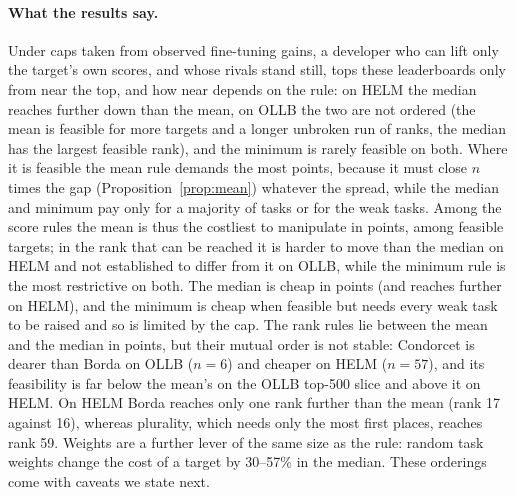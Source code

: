 \documentclass{article}
\begin{document}
\paragraph{What the results say.}
Under caps taken from observed fine-tuning gains, a developer who can lift only the target's own scores, and whose rivals stand still, tops these leaderboards only from near the top, and how near depends on the rule: on HELM the median reaches further down than the mean, on OLLB the two are not ordered (the mean is feasible for more targets and a longer unbroken run of ranks, the median has the largest feasible rank), and the minimum is rarely feasible on both. Where it is feasible the mean rule demands the most points, because it must close $n$ times the gap (Proposition~\ref{prop:mean}) whatever the spread, while the median and minimum pay only for a majority of tasks or for the weak tasks. Among the score rules the mean is thus the costliest to manipulate in points, among feasible targets; in the rank that can be reached it is harder to move than the median on HELM and not established to differ from it on OLLB, while the minimum rule is the most restrictive on both. The median is cheap in points (and reaches further on HELM), and the minimum is cheap when feasible but needs every weak task to be raised and so is limited by the cap. The rank rules lie between the mean and the median in points, but their mutual order is not stable: Condorcet is dearer than Borda on OLLB ($n=6$) and cheaper on HELM ($n=57$), and its feasibility is far below the mean's on the OLLB top-500 slice and above it on HELM. On HELM Borda reaches only one rank further than the mean (rank 17 against 16), whereas plurality, which needs only the most first places, reaches rank 59. Weights are a further lever of the same size as the rule: random task weights change the cost of a target by 30--57\% in the median. These orderings come with caveats we state next.
\end{document}

